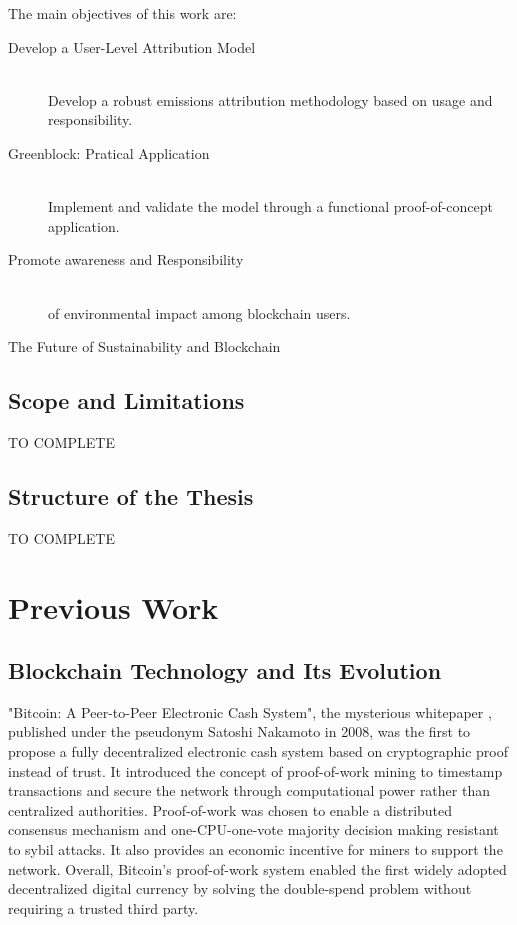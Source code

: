 \documentclass[11pt]{report}
\begin{document}
The main objectives of this work are:

\begin{description}

    \item [Develop a User-Level Attribution Model] \hfill \\
          Develop a robust emissions attribution methodology based on usage and responsibility.
    \item [Greenblock: Pratical Application] \hfill \\
          Implement and validate the model through a functional proof-of-concept application.
    \item [Promote awareness and Responsibility] \hfill \\
          of environmental impact among blockchain users.
    \item [The Future of Sustainability and Blockchain] 
\end{description}

\section{Scope and Limitations}
TO COMPLETE


\section{Structure of the Thesis}
TO COMPLETE

\chapter{Previous Work} \label{ch:previous_work}


\section{Blockchain Technology and Its Evolution}

"Bitcoin: A Peer-to-Peer Electronic Cash System", the mysterious whitepaper \cite{nakamotoBitcoinPeertopeerElectronic2008}, published under the pseudonym Satoshi Nakamoto in 2008, was the first to propose a fully decentralized electronic cash system based on cryptographic proof instead of trust. It introduced the concept of proof-of-work mining to timestamp transactions and secure the network through computational power rather than centralized authorities. Proof-of-work was chosen to enable a distributed consensus mechanism and one-CPU-one-vote majority decision making resistant to sybil attacks. It also provides an economic incentive for miners to support the network. Overall, Bitcoin's proof-of-work system enabled the first widely adopted decentralized digital currency by solving the double-spend problem without requiring a trusted third party.
\end{document}
